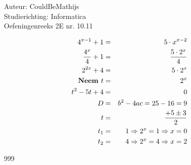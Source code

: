\documentclass[a4paper]{article}
\begin{document}
  
\noindent \large Auteur: CouldBeMathijs \\
\noindent \large Studierichting: Informatica\\
\noindent \large Oefeningenreeks 2E nr. 10.11\\

\medskip

\normalsize

\begin{eqnarray*}
    4^{x-1} + 1 &=& 5 \cdot x^{x-2} \\
    \dfrac{4^x}{4} + 1 &=& \dfrac{5 \cdot 2^x}{4}\\
    2^{2x} + 4 &=& 5 \cdot 2^x\\
    \text{\textbf{Neem }} t & = &2^x\\
    t^2 -5t + 4 &=& 0\\
    D &=& b^2 - 4ac = 25 - 16 = 9\\
    t &=& \dfrac{+5 \pm 3}{2}\\
    t_1 &=& 1 \Rightarrow 2^x = 1 \Rightarrow x = 0\\
    t_2 &=& 4 \Rightarrow 2^x = 4 \Rightarrow x = 2\\
\end{eqnarray*}


\begin{thebibliography}{999}
\end{thebibliography}
\end{document}
